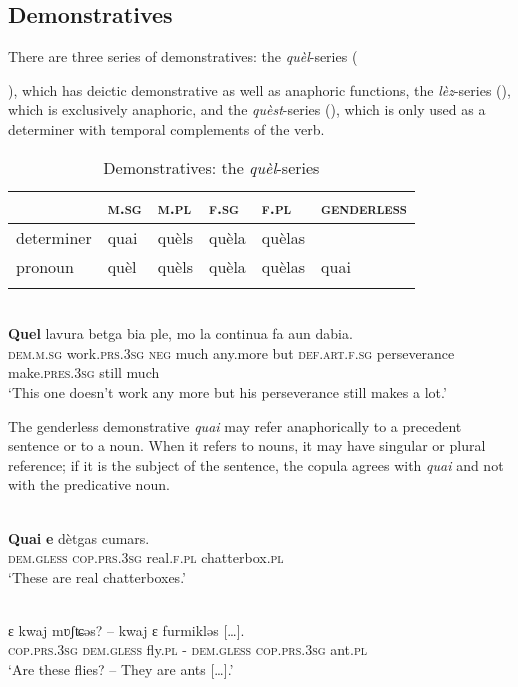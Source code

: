 \subsection{Demonstratives}
There are three series of demonstratives: the \textit{quèl}-series ({), which has deictic demonstrative as well as anaphoric functions, the \textit{lèz}-series ({}), which is exclusively an\-a\-phor\-ic, and the \textit{quèst}-series ({}), which is only used as a determiner with temporal complements of the verb.

\begin{table}
\caption{Demonstratives: the \textit{quèl}-series}
\label{demquel}
 \begin{tabular}{llllll}
  \lsptoprule
            & \textsc{m.sg} & \textsc{m.pl} & \textsc{f.sg} & \textsc{f.pl} & \textsc{genderless}\\
  \midrule
  determiner  & quai &  quèls  & quèla  & quèlas\\
  pronoun  & quèl & quèls & quèla & quèlas & quai\\
  \lspbottomrule
 \end{tabular}
\end{table}

\ea\label{}
\\
\gll    \textbf{Quel} lavura betga bia ple, mo la continua fa aun dabia.\\
     \textsc{dem.m.sg} work.\textsc{prs.3sg} \textsc{neg} much any.more but \textsc{def.art.f.sg} perseverance make.\textsc{pres.3sg} still much\\
\glt `This one doesn’t work any more but his perseverance still makes a lot.'
\z


The genderless demonstrative \textit{quai} may refer anaphorically to a precedent sentence %
or to a noun. When it refers to nouns, it may have singular or plural reference; if it is the subject of the sentence, the copula agrees with \textit{quai} and not with the predicative noun.

\ea\label{}
\\
\gll \textbf{Quai} \textbf{e} dètgas cumars.\\
\textsc{dem.gless} \textsc{cop.prs.3sg} real.\textsc{f.pl} chatterbox.\textsc{pl}\\
\glt `These are real chatterboxes.'
\z

\ea\label{}
\\
\gll ɛ kwaj mʋʃʨəs? – kwaj ɛ furmikləs […].\\
     \textsc{cop.prs.3sg} \textsc{dem.gless} fly.\textsc{pl} -  \textsc{dem.gless} \textsc{cop.prs.3sg} ant.\textsc{pl}\\
\glt `Are these flies? – They are ants […].'
\z

}
